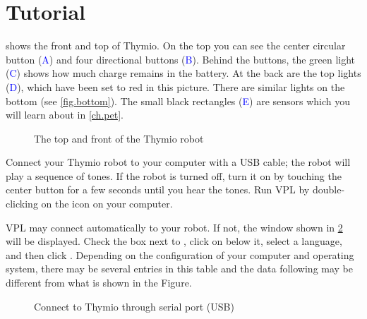 \part{Tutorial}

\label{ch.intro}


 shows the front and top of Thymio. On the top you
can see the center circular button (\textcolor{blue}{A}) and four
directional buttons (\textcolor{blue}{B}). Behind the buttons, the green
light (\textcolor{blue}{C}) shows how much charge remains in the
battery. At the back are the top lights (\textcolor{blue}{D}), which
have been set to red in this picture. There are similar lights on the
bottom (see \cref{fig.bottom}). The small black rectangles
(\textcolor{blue}{E}) are sensors which you will learn about in
\cref{ch.pet}.

\begin{figure}[h]
\begin{center}
\caption{The top and front of the Thymio robot}\label{fig.front}
\end{center}
\end{figure}


Connect your Thymio robot to your computer with a USB cable; the robot
will play a sequence of tones. If the robot is turned off, turn it on by
touching the center button for a few seconds until you hear the tones.
Run VPL by double-clicking on the icon  on your
computer.


VPL may connect automatically to your robot. If not, the window shown in
\cref{fig.connect} will be displayed. Check the box next to ,
click on  below it, select a language, and then click
. Depending on the configuration of your computer and
operating system, there may be several entries in this table and the
data following  may be different from what is shown in
the Figure.


\begin{figure}
\begin{center}
\caption{Connect to Thymio through serial port (USB)}\label{fig.connect}
\end{center}
\end{figure}

